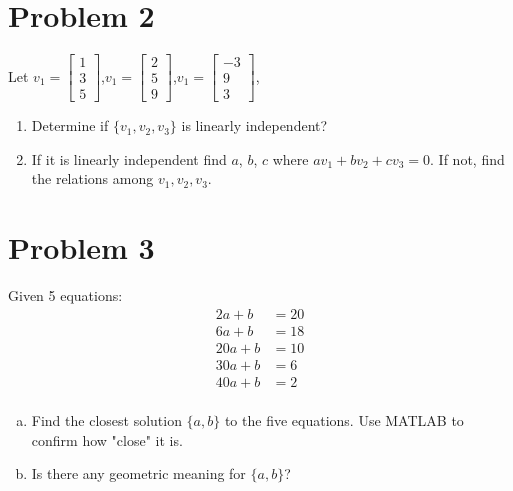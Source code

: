 \documentclass{article}
\begin{document}
\section*{Problem 2}
Let $v_1=\begin{bmatrix} 1 \\ 3 \\ 5 \end{bmatrix}$,$v_1=\begin{bmatrix} 2 \\ 5 \\ 9 \end{bmatrix}$,$v_1=\begin{bmatrix} -3 \\ 9 \\ 3 \end{bmatrix}$,
\begin{enumerate}[1)]
\item Determine if $\{v_1,v_2,v_3\}$ is linearly independent?
\newline
\item If it is linearly independent find $a$, $b$, $c$ where $av_1 + bv_2 + cv_3 = 0$.
If not, find the relations among $v_1,v_2,v_3$.
\newline
\end{enumerate}

\section*{Problem 3}
Given 5 equations:
\begin{align*}
 2a + b &= 20 \\
 6a + b &= 18 \\
20a + b &= 10 \\
30a + b &=  6 \\
40a + b &=  2 \\
\end{align*}
\begin{enumerate}[a)]
\item Find the closest solution $\{a,b\}$ to the five equations.
{\color{blue} Use MATLAB to confirm how "close" it is.}
\newline
\item Is there any geometric meaning for $\{a,b\}$?
\newline
\end{enumerate}
\end{document}
